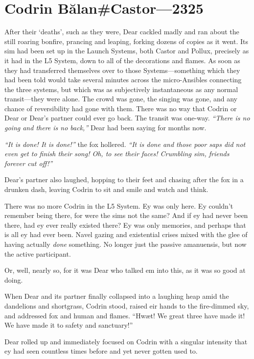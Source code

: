 \hypertarget{codrin-bux103lancastor-2325}{%
\chapter{Codrin Bălan\#Castor—2325}\label{codrin-bux103lancastor-2325}}

After their `deaths', such as they were, Dear cackled madly and ran about the still roaring bonfire, prancing and leaping, forking dozens of copies as it went. Its sim had been set up in the Launch Systems, both Castor and Pollux, precisely as it had in the L5 System, down to all of the decorations and flames. As soon as they had transferred themselves over to those Systems---something which they had been told would take several minutes across the micro-Ansibles connecting the three systems, but which was as subjectively instantaneous as any normal transit---they were alone. The crowd was gone, the singing was gone, and any chance of reversibility had gone with them. There was no way that Codrin or Dear or Dear's partner could ever go back. The transit was one-way. \emph{``There is no going and there is no back,''} Dear had been saying for months now.

\emph{``It is done! It is done!''} the fox hollered. \emph{``It is done and those poor saps did not even get to finish their song! Oh, to see their faces! Crumbling sim, friends forever cut off!''}

Dear's partner also laughed, hopping to their feet and chasing after the fox in a drunken dash, leaving Codrin to sit and smile and watch and think.

There was no more Codrin in the L5 System. Ey was only here. Ey couldn't remember being there, for were the sims not the same? And if ey had never been there, had ey ever really existed there? Ey was only memories, and perhaps that is all ey had ever been. Navel gazing and existential crises mixed with the glee of having actually \emph{done} something. No longer just the passive amanuensis, but now the active participant.

Or, well, nearly so, for it was Dear who talked em into this, as it was so good at doing.

When Dear and its partner finally collapsed into a laughing heap amid the dandelions and shortgrass, Codrin stood, raised eir hands to the fire-dimmed sky, and addressed fox and human and flames. ``Hwæt! We great three have made it! We have made it to safety and sanctuary!''

Dear rolled up and immediately focused on Codrin with a singular intensity that ey had seen countless times before and yet never gotten used to.

